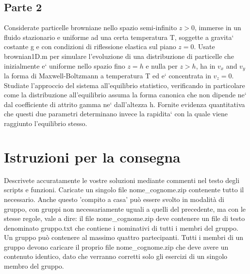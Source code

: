 \documentclass[a4paper,11pt]{article}
\begin{document}
\subsection{Parte 2}
Considerate particelle browniane nello spazio semi-infinito $z>0$, immerse in un fluido stazionario e uniforme ad una certa temperatura T, soggette a gravita` costante g e con condizioni di riflessione elastica sul piano $z=0$. Usate brownian1D.m per simulare l'evoluzione di una distribuzione di particelle che inizialmente e` uniforme nello spazio fino $z=h$ e nulla per $z>h$, ha in $v_x$ and $v_y$ la forma di Maxwell-Boltzmann a temperatura T ed e` concentrata in $v_z=0$. Studiate l'approccio del sistema all'equilibrio statistico, verificando in particolare come la distribuzione all'equilibrio assuma la forma canonica che non dipende ne` dal coefficiente di attrito gamma ne` dall'altezza h. Fornite evidenza quantitativa che questi due parametri determinano invece la rapidita` con la quale viene raggiunto l'equilibrio stesso.

\section{Istruzioni per la consegna}
Descrivete accuratamente le vostre soluzioni mediante commenti nel testo degli scripts e funzioni.
Caricate un singolo file nome\_cognome.zip contenente tutto il necessario.
Anche questo 'compito a casa' può essere svolto in modalità di gruppo, con gruppi non necessariamente uguali a quelli del precedente, ma con le stesse regole, vale a dire:
il  file nome\_cognome.zip deve contenere un file di testo denominato gruppo.txt che contiene i nominativi di tutti i membri del gruppo. Un gruppo può contenere al massimo quattro partecipanti. Tutti i membri di un gruppo devono caricare il proprio file nome\_cognome.zip che deve avere un contenuto identico, dato che verranno corretti solo gli esercizi di un singolo membro del gruppo.
\end{document}
